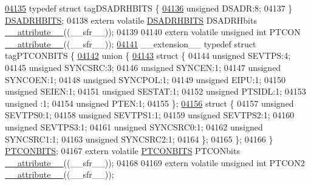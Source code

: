 \begin{DoxyCode}
\hypertarget{a00009_source_l04135}{}\hyperlink{a00008}{04135} \textcolor{keyword}{typedef} \textcolor{keyword}{struct }tagDSADRHBITS \{
\hypertarget{a00009_source_l04136}{}\hyperlink{a00008_ac838566a37b16a38ab17d17e307239e7}{04136}   \textcolor{keywordtype}{unsigned} DSADR:8;
04137 \} \hyperlink{a00008_d9/dd5/a00432}{DSADRHBITS};
04138 \textcolor{keyword}{extern} \textcolor{keyword}{volatile} \hyperlink{a00008_d9/dd5/a00432}{DSADRHBITS} DSADRHbits \hyperlink{a00009_a493c46f03454991ccc5aa7a6e1dfb2a7}{\_\_attribute\_\_}((\_\_sfr\_\_));
04139 
04140 \textcolor{keyword}{extern} \textcolor{keyword}{volatile} \textcolor{keywordtype}{unsigned} \textcolor{keywordtype}{int}  PTCON \hyperlink{a00009_a493c46f03454991ccc5aa7a6e1dfb2a7}{\_\_attribute\_\_}((\_\_sfr\_\_));
\hypertarget{a00009_source_l04141}{}\hyperlink{a00008}{04141} \_\_extension\_\_ \textcolor{keyword}{typedef} \textcolor{keyword}{struct }tagPTCONBITS \{
\hypertarget{a00009_source_l04142}{}\hyperlink{a00009}{04142}   \textcolor{keyword}{union }\{
\hypertarget{a00009_source_l04143}{}\hyperlink{a00009}{04143}     \textcolor{keyword}{struct }\{
04144       \textcolor{keywordtype}{unsigned} SEVTPS:4;
04145       \textcolor{keywordtype}{unsigned} SYNCSRC:3;
04146       \textcolor{keywordtype}{unsigned} SYNCEN:1;
04147       \textcolor{keywordtype}{unsigned} SYNCOEN:1;
04148       \textcolor{keywordtype}{unsigned} SYNCPOL:1;
04149       \textcolor{keywordtype}{unsigned} EIPU:1;
04150       \textcolor{keywordtype}{unsigned} SEIEN:1;
04151       \textcolor{keywordtype}{unsigned} SESTAT:1;
04152       \textcolor{keywordtype}{unsigned} PTSIDL:1;
04153       \textcolor{keywordtype}{unsigned} :1;
04154       \textcolor{keywordtype}{unsigned} PTEN:1;
04155     \};
\hypertarget{a00009_source_l04156}{}\hyperlink{a00009}{04156}     \textcolor{keyword}{struct }\{
04157       \textcolor{keywordtype}{unsigned} SEVTPS0:1;
04158       \textcolor{keywordtype}{unsigned} SEVTPS1:1;
04159       \textcolor{keywordtype}{unsigned} SEVTPS2:1;
04160       \textcolor{keywordtype}{unsigned} SEVTPS3:1;
04161       \textcolor{keywordtype}{unsigned} SYNCSRC0:1;
04162       \textcolor{keywordtype}{unsigned} SYNCSRC1:1;
04163       \textcolor{keywordtype}{unsigned} SYNCSRC2:1;
04164     \};
04165   \};
04166 \} \hyperlink{a00008_d8/ddc/a00655}{PTCONBITS};
04167 \textcolor{keyword}{extern} \textcolor{keyword}{volatile} \hyperlink{a00008_d8/ddc/a00655}{PTCONBITS} PTCONbits \hyperlink{a00009_a493c46f03454991ccc5aa7a6e1dfb2a7}{\_\_attribute\_\_}((\_\_sfr\_\_));
04168 
04169 \textcolor{keyword}{extern} \textcolor{keyword}{volatile} \textcolor{keywordtype}{unsigned} \textcolor{keywordtype}{int}  PTCON2 \hyperlink{a00009_a493c46f03454991ccc5aa7a6e1dfb2a7}{\_\_attribute\_\_}((\_\_sfr\_\_));

\end{DoxyCode}

